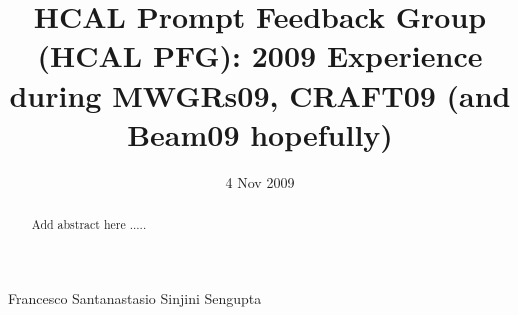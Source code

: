 %
\begin{titlepage}

  \date{4 Nov 2009}


  \title{HCAL Prompt Feedback Group (HCAL PFG): 2009 Experience during MWGRs09, CRAFT09 (and Beam09 hopefully)}

  \begin{Authlist}
   Francesco Santanastasio
   Sinjini Sengupta
  \end{Authlist}


  \begin{abstract}
  Add abstract here .....
  \end{abstract} 


\end{titlepage}

\setcounter{page}{2}%

